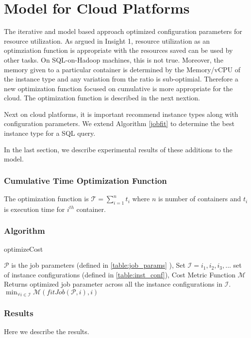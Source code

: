 \section{Model for Cloud Platforms}
\label{sec:modelcloud}
The iterative and model based approach optimized configuration parameters for resource utilization. As argued in Insight 1, 
resource utilization as an optimziation function is appropriate with the resources saved can be used by other tasks. On SQL-on-Hadoop
machines, this is not true. Moreover, the memory given to a particular container is determined by the Memory/vCPU of the instance type 
and any variation from the ratio is sub-optimial. Therefore a new optimization function focused on cumulative is more appropriate for the cloud.
The optimization function is described in the next nextion.

Next on cloud platforms, it is important recommend instance types along with configuration parameters. We extend Algorithm \ref{jobfit} to determine
the best instance type for a SQL query.

In the last section, we describe experimental results of these additions to the model.

\noindent\subsubsection*{Cumulative Time Optimization Function}
The optimization function is 
$\mathcal{T} = \sum_{i=1}^{n} t_i$ where $n$ is number of containers and $t_i$ is execution time for $i^{th}$ container. 

\noindent\subsubsection*{Algorithm}

\begin{algorithm}
\caption{optimizeCost} \label{cost_optimize}
\begin{algorithmic}[1]
\footnotesize
\REQUIRE $\mathcal{P}$ is the job parameters (defined in \ref{table:job_params} ), Set $\mathcal{I} = {i_1, i_2, i_3, ...} $ set of instance configurations (defined in \ref{table:inst_conf}), Cost Metric Function $\mathcal{M}$
\ENSURE Returns optimized job parameter across all the instance configurations in $\mathcal{I}$.
\RETURN $\min_{\forall i \in \mathcal{I}} \mathcal{M}(fitJob(\mathcal{P}, i), i)$
\end{algorithmic}
\end{algorithm}

\noindent\subsubsection*{Results}

Here we describe the results. 
